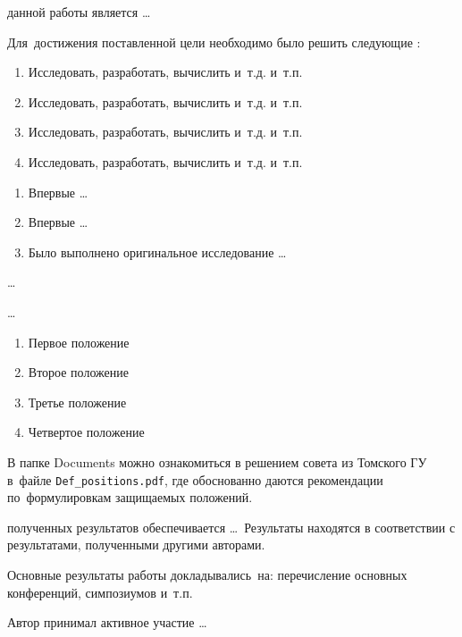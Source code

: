 
{\aim} данной работы является \ldots

Для~достижения поставленной цели необходимо было решить следующие {\tasks}:
\begin{enumerate}
  \item Исследовать, разработать, вычислить и~т.\:д. и~т.\:п.
  \item Исследовать, разработать, вычислить и~т.\:д. и~т.\:п.
  \item Исследовать, разработать, вычислить и~т.\:д. и~т.\:п.
  \item Исследовать, разработать, вычислить и~т.\:д. и~т.\:п.
\end{enumerate}


{\novelty}
\begin{enumerate}
  \item Впервые \ldots
  \item Впервые \ldots
  \item Было выполнено оригинальное исследование \ldots
\end{enumerate}

{\influence} \ldots

{\methods} \ldots

{}
\begin{enumerate}
  \item Первое положение
  \item Второе положение
  \item Третье положение
  \item Четвертое положение
\end{enumerate}
В папке Documents можно ознакомиться в решением совета из Томского ГУ
в~файле \verb+Def_positions.pdf+, где обоснованно даются рекомендации
по~формулировкам защищаемых положений.

{\reliability} полученных результатов обеспечивается \ldots \ Результаты находятся в соответствии с результатами, полученными другими авторами.


{\probation}
Основные результаты работы докладывались~на:
перечисление основных конференций, симпозиумов и~т.\:п.

{\contribution} Автор принимал активное участие \ldots


